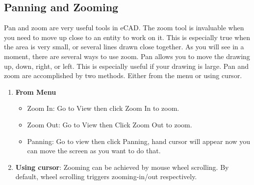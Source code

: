 \subsection{Panning and Zooming}
Pan and zoom are very useful tools in eCAD. The zoom tool is invaluable when you need to move up close to an entity to work on it. This is especially true when the area is very small, or several lines drawn close together. As you will see in a moment, there are several ways to use zoom. Pan allows you to move the drawing up, down, right, or left. This is especially useful if your drawing is large. Pan and zoom are accomplished by two methods. Either from the menu or using cursor.
\begin{enumerate}
\item \textbf{From Menu}
\begin{itemize}
\item Zoom In: Go to View then click Zoom In to zoom.
\item Zoom Out: Go to View then Click Zoom Out to zoom.
\item Panning: Go to view then click Panning, hand cursor will appear now you can move the screen as you want to do that.
\end{itemize}
\item \textbf{Using cursor}:
Zooming can be achieved by mouse wheel scrolling. By default, wheel scrolling triggers zooming-in/out respectively.
\end{enumerate}

